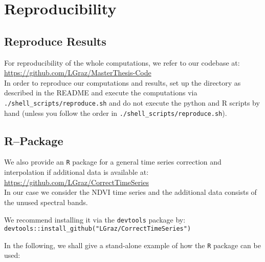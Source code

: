 \chapter{Reproducibility}\label{app:reproducibility}

\section{Reproduce Results}
For reproducibility of the whole computations, we refer to our codebase at:\\ \url{https://github.com/LGraz/MasterThesis-Code}\\ In order to reproduce our computations and results, set up the directory as described in the README and execute the computations via \texttt{./shell\_scripts/reproduce.sh} and do not execute the python and R scripts by hand (unless you follow the order in \texttt{./shell\_scripts/reproduce.sh}).

\section{R--Package}
We also provide an \texttt{R} package for a general time series correction and interpolation if additional data is available at: \\
\url{https://github.com/LGraz/CorrectTimeSeries} \\
In our case we consider the NDVI time series and the additional data consists of the unused spectral bands.

We recommend installing it via the \texttt{devtools} package by:\\
\texttt{devtools::install\_github("LGraz/CorrectTimeSeries")}

In the following, we shall give a stand-alone example of how the \texttt{R} package can be used:


